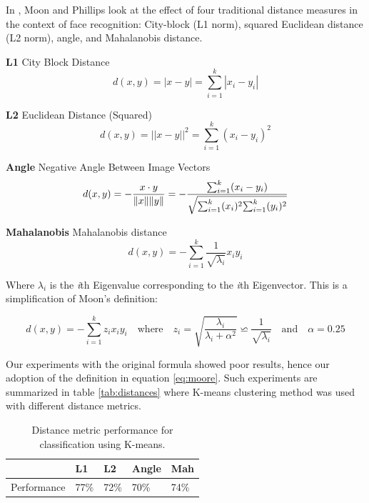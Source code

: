 In \cite{moon2001computational}, Moon and Phillips look at the effect of four traditional distance measures in the context of face recognition: City-block (L1 norm), squared Euclidean distance (L2 norm), angle, and Mahalanobis distance. 

\textbf{L1} City Block Distance
\begin{equation}
        d(x,y) = |x-y| = \sum_{i=1}^{k}|x_i - y_i|
\end{equation}

\textbf{L2} Euclidean Distance (Squared)
\begin{equation}
        d(x,y) = ||x-y||^2 = \sum_{i=1}^{k}(x_i - y_i)^2
\end{equation}

\textbf{Angle} Negative Angle Between Image Vectors
\begin{equation}
        d(x,y) = - \frac{x\cdot y}{\Arrowvert x\Arrowvert \Arrowvert y\Arrowvert} = -\frac{\sum_{i=1}^{k}(x_i - y_i)}{\sqrt{\sum_{i=1}^{k}(x_i)^2{\sum_{i=1}^{k}(y_i)^2}}}
\end{equation}	

\textbf{Mahalanobis} Mahalanobis distance
\begin{equation}
        d(x,y) = - \sum_{i=1}^{k} \frac{1}{\sqrt{\lambda_i}}x_iy_i
\end{equation}

Where $\lambda_i$ is the \textit{i}th Eigenvalue corresponding to the \textit{i}th Eigenvector. This is a simplification of Moon's definition:

\begin{equation}\label{eq:moore}
        d(x,y) = - \sum_{i=1}^{k} z_ix_iy_i \quad \textrm{where} \quad z_i = \sqrt{\frac{\lambda_i}{\lambda_i + \alpha^2}} \backsimeq \frac{1}{\sqrt{\lambda_i}} \quad \textrm{and} \quad \alpha=0.25
\end{equation}

Our experiments with the original formula showed poor results, hence our adoption of the definition in equation \ref{eq:moore}. Such experiments are summarized in table \ref{tab:distances} where K-means clustering method was used with different distance metrics.

\begin{table}[h!]
\centering
\begin{tabular}{l|l|l|l|l}
 		 		  & L1    & L2 & Angle & Mah \\ \hline	
Performance  	  & 77\% &  72\%  &	70\%   &  74\% 	    	

\end{tabular}
\caption{Distance metric performance for classification using K-means.}
\end{table}\label{tab:distances}

